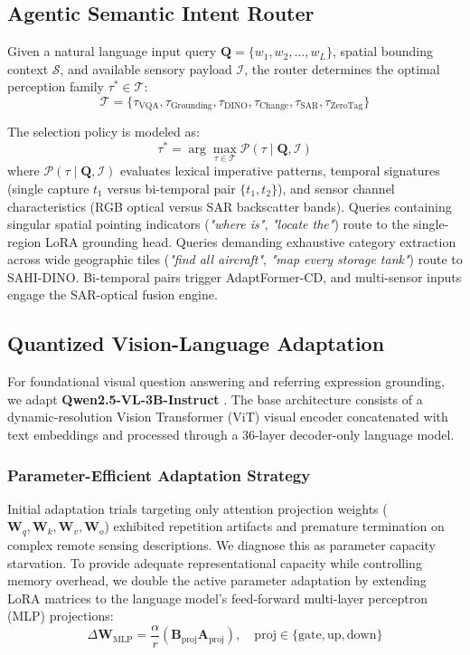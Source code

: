 \documentclass[lettersize,journal]{IEEEtran}
\begin{document}
\subsection{Agentic Semantic Intent Router}
Given a natural language input query $\mathbf{Q} = \{w_1, w_2, \dots, w_L\}$, spatial bounding context $\mathcal{S}$, and available sensory payload $\mathcal{I}$, the router determines the optimal perception family $\tau^* \in \mathcal{T}$:
\begin{equation}
\mathcal{T} = \{\tau_{\text{VQA}}, \tau_{\text{Grounding}}, \tau_{\text{DINO}}, \tau_{\text{Change}}, \tau_{\text{SAR}}, \tau_{\text{ZeroTag}}\}
\end{equation}

The selection policy is modeled as:
\begin{equation}
\tau^* = \arg\max_{\tau \in \mathcal{T}} \mathcal{P}(\tau \mid \mathbf{Q}, \mathcal{I})
\end{equation}
where $\mathcal{P}(\tau \mid \mathbf{Q}, \mathcal{I})$ evaluates lexical imperative patterns, temporal signatures (single capture $t_1$ versus bi-temporal pair $\{t_1, t_2\}$), and sensor channel characteristics (RGB optical versus SAR backscatter bands). Queries containing singular spatial pointing indicators (\textit{"where is"}, \textit{"locate the"}) route to the single-region LoRA grounding head. Queries demanding exhaustive category extraction across wide geographic tiles (\textit{"find all aircraft"}, \textit{"map every storage tank"}) route to SAHI-DINO. Bi-temporal pairs trigger AdaptFormer-CD, and multi-sensor inputs engage the SAR-optical fusion engine.

\subsection{Quantized Vision-Language Adaptation}
For foundational visual question answering and referring expression grounding, we adapt \textbf{Qwen2.5-VL-3B-Instruct} \cite{qwen2025qwen2vl}. The base architecture consists of a dynamic-resolution Vision Transformer (ViT) visual encoder concatenated with text embeddings and processed through a 36-layer decoder-only language model.

\subsubsection{Parameter-Efficient Adaptation Strategy}
Initial adaptation trials targeting only attention projection weights ($\mathbf{W}_q, \mathbf{W}_k, \mathbf{W}_v, \mathbf{W}_o$) exhibited repetition artifacts and premature termination on complex remote sensing descriptions. We diagnose this as parameter capacity starvation. To provide adequate representational capacity while controlling memory overhead, we double the active parameter adaptation by extending LoRA matrices to the language model's feed-forward multi-layer perceptron (MLP) projections:
\begin{equation}
\Delta \mathbf{W}_{\text{MLP}} = \frac{\alpha}{r} (\mathbf{B}_{\text{proj}} \mathbf{A}_{\text{proj}}), \quad \text{proj} \in \{\text{gate}, \text{up}, \text{down}\}
\end{equation}
\end{document}
